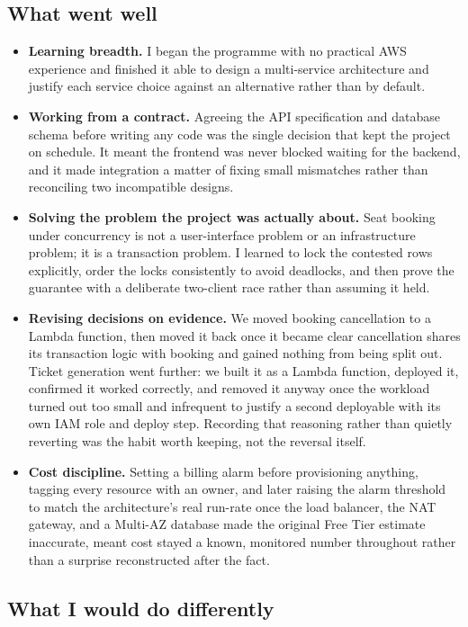 \documentclass[a4paper,12pt]{article}
\begin{document}
\subsection{What went well}

\begin{itemize}
    \item \textbf{Learning breadth.} I began the programme with no practical AWS experience and finished it able to design a multi-service architecture and justify each service choice against an alternative rather than by default.
    \item \textbf{Working from a contract.} Agreeing the API specification and database schema before writing any code was the single decision that kept the project on schedule. It meant the frontend was never blocked waiting for the backend, and it made integration a matter of fixing small mismatches rather than reconciling two incompatible designs.
    \item \textbf{Solving the problem the project was actually about.} Seat booking under concurrency is not a user-interface problem or an infrastructure problem; it is a transaction problem. I learned to lock the contested rows explicitly, order the locks consistently to avoid deadlocks, and then prove the guarantee with a deliberate two-client race rather than assuming it held.
    \item \textbf{Revising decisions on evidence.} We moved booking cancellation to a Lambda function, then moved it back once it became clear cancellation shares its transaction logic with booking and gained nothing from being split out. Ticket generation went further: we built it as a Lambda function, deployed it, confirmed it worked correctly, and removed it anyway once the workload turned out too small and infrequent to justify a second deployable with its own IAM role and deploy step. Recording that reasoning rather than quietly reverting was the habit worth keeping, not the reversal itself.
    \item \textbf{Cost discipline.} Setting a billing alarm before provisioning anything, tagging every resource with an owner, and later raising the alarm threshold to match the architecture's real run-rate once the load balancer, the NAT gateway, and a Multi-AZ database made the original Free Tier estimate inaccurate, meant cost stayed a known, monitored number throughout rather than a surprise reconstructed after the fact.
\end{itemize}

\subsection{What I would do differently}
\end{document}
